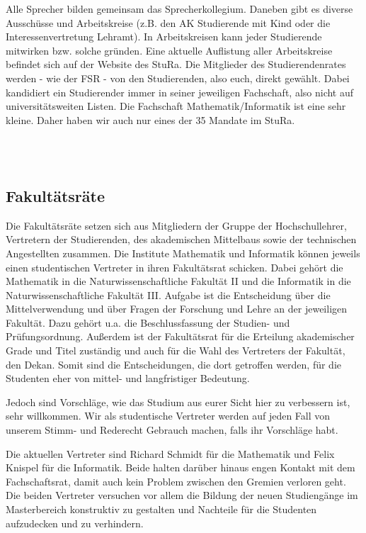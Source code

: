Alle Sprecher bilden gemeinsam das Sprecherkollegium.
Daneben gibt es diverse Ausschüsse und Arbeitskreise (z.B. den AK Studierende mit Kind oder die Interessenvertretung Lehramt).
In Arbeitskreisen kann jeder Studierende mitwirken bzw. solche gründen.
Eine aktuelle Auflistung aller Arbeitskreise befindet sich auf der Website des StuRa.
Die Mitglieder des Studierendenrates werden - wie der FSR - von den Studierenden, also euch, direkt gewählt.
Dabei kandidiert ein Studierender immer in seiner jeweiligen Fachschaft, also nicht auf universitätsweiten Listen.
Die Fachschaft Mathematik/Informatik ist eine sehr kleine.
Daher haben wir auch nur eines der 35 Mandate im StuRa.


\\
\\

\subsection{Fakultätsräte}

Die Fakultätsräte setzen sich aus Mitgliedern der Gruppe der Hochschullehrer, Vertretern der Studierenden, des akademischen Mittelbaus sowie der technischen Angestellten zusammen.
Die Institute Mathematik und Informatik können jeweils einen studentischen Vertreter in ihren Fakultätsrat schicken.
Dabei gehört die Mathematik in die Naturwissenschaftliche Fakultät II und die Informatik in die Naturwissenschaftliche Fakultät III.
Aufgabe ist die Entscheidung über die Mittelverwendung und über Fragen der Forschung und Lehre an der jeweiligen Fakultät.
Dazu gehört u.a. die Beschlussfassung der Studien- und Prüfungsordnung.
Außerdem ist der Fakultätsrat für die Erteilung akademischer Grade und Titel zuständig und auch für die Wahl des Vertreters der Fakultät, den Dekan.
Somit sind die Entscheidungen, die dort getroffen werden, für die Studenten eher von mittel- und langfristiger Bedeutung.

Jedoch sind Vorschläge, wie das Studium aus eurer Sicht hier zu verbessern ist, sehr willkommen.
Wir als studentische Vertreter werden auf jeden Fall von unserem Stimm- und Rederecht Gebrauch machen, falls ihr Vorschläge habt.

Die aktuellen Vertreter sind Richard Schmidt für die Mathematik und Felix Knispel für die Informatik.
Beide halten darüber hinaus engen Kontakt mit dem Fachschaftsrat, damit auch kein Problem zwischen den Gremien verloren geht.
Die beiden Vertreter versuchen vor allem die Bildung der neuen Studiengänge im Masterbereich konstruktiv zu gestalten und Nachteile für die Studenten aufzudecken und zu verhindern.

